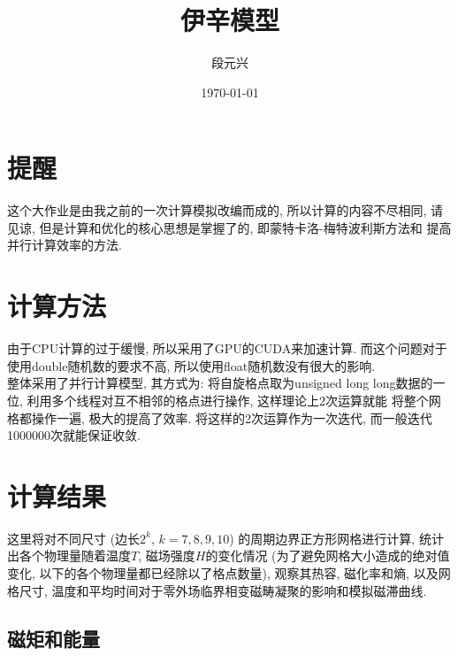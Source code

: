 \documentclass[UTF8]{ctexart}
\title{伊辛模型}
\author{段元兴}
\date{\today}
\begin{document}
\maketitle
\thispagestyle{empty}
\setcounter{page}{1}
\newpage
\tableofcontents
\newpage
    \section{提醒}
        \indent 这个大作业是由我之前的一次计算模拟改编而成的, 所以计算的内容不尽相同, 请见谅, 但是计算和优化的核心思想是掌握了的, 即蒙特卡洛-梅特波利斯方法和
        提高并行计算效率的方法.
    \section{计算方法}
        \indent 由于CPU计算的过于缓慢, 所以采用了GPU的CUDA来加速计算. 而这个问题对于使用double随机数的要求不高, 所以使用float随机数没有很大的影响.\\
        \indent 整体采用了并行计算模型, 其方式为: 将自旋格点取为unsigned long long数据的一位, 利用多个线程对互不相邻的格点进行操作, 这样理论上2次运算就能
        将整个网格都操作一遍, 极大的提高了效率. 将这样的2次运算作为一次迭代, 而一般迭代1000000次就能保证收敛.
    \section{计算结果}
        \indent 这里将对不同尺寸 (边长$2^k$, $k=7,8,9,10$) 的周期边界正方形网格进行计算, 统计出各个物理量随着温度$T$, 磁场强度$H$的变化情况 (为了避免网格大小造成的绝对值变化,
        以下的各个物理量都已经除以了格点数量), 观察其热容, 磁化率和熵, 以及网格尺寸, 温度和平均时间对于零外场临界相变磁畴凝聚的影响和模拟磁滞曲线.
        \subsection{磁矩和能量}
\end{document}
